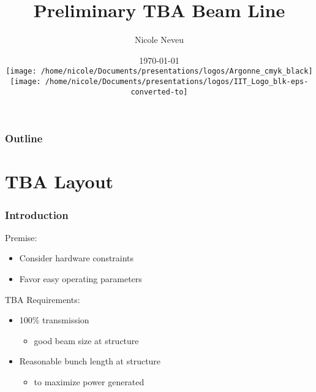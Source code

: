 \documentclass[professionalfonts,t]{beamer}
\title[May 2018]{Preliminary TBA Beam Line}
\author[N.Neveu]{{\Large Nicole Neveu}}
\institute[ANL, IIT] %
{   Illinois Institute of Technology \\
	Argonne National Laboratory \\
    \url{nneveu@anl.gov} 
}
\date{ \today \\
\texttt{[image: /home/nicole/Documents/presentations/logos/Argonne\_cmyk\_black]}%
\hfill \hfill \hfill%
\texttt{[image: /home/nicole/Documents/presentations/logos/IIT\_Logo\_blk-eps-converted-to]}%
}
\begin{document}
\begin{frame}
  \titlepage
\end{frame}


\begin{frame}
	\frametitle{Outline}
	\tableofcontents
\end{frame}

\section{TBA Layout}
\begin{frame}
\frametitle{Introduction}
Premise: 
\begin{itemize}
	\item Consider hardware constraints
	\item Favor easy operating parameters
\end{itemize}

\vspace{0.5em}
TBA Requirements:
\begin{itemize}
	\item 100\% transmission 
	\begin{itemize}
		\item good beam size at structure
	\end{itemize}
	\item Reasonable bunch length at structure
	\begin{itemize}
		\item to maximize power generated
	\end{itemize}
\end{itemize}
	 
\end{frame}



\end{document}
